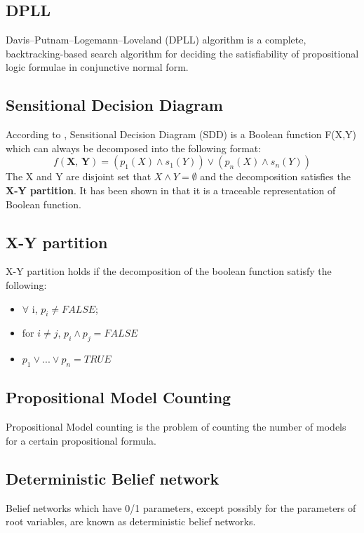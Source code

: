     \subsection{DPLL}
    Davis–Putnam–Logemann–Loveland (DPLL) algorithm is a complete, backtracking-based search algorithm for deciding the satisfiability of propositional logic formulae in conjunctive normal form. \cite{Davis:1960:CPQ:321033.321034}
    
   
    \subsection{Sensitional Decision Diagram}
    According to \cite{Darwiche:2011:SNC:2283516.2283536}, Sensitional Decision Diagram (SDD) is a Boolean function F(X,Y) which can always be decomposed into the following format:
    $$f(\textbf{X, Y}) = (p_{1}(X) \wedge s_{1}(Y)) \vee (p_{n}(X) \wedge s_{n}(Y)) $$
    The X and Y are disjoint set that $X \wedge Y = \emptyset$ and the decomposition satisfies the \textbf{X-Y partition}. It has been shown in \cite{Darwiche:2011:SNC:2283516.2283536} that it is a traceable representation of Boolean function.
    
    \subsection{X-Y partition}
    X-Y partition holds if the decomposition of the boolean function satisfy the following:
    \begin{itemize}
        \item  $\forall$ i, $p_{i} \neq FALSE$;
        \item for $i \neq j$, $p_{i} \wedge p_{j} = FALSE$
        \item $p_{1} \vee ... \vee p_{n} = TRUE$
    \end{itemize}
    
    \subsection{Propositional Model Counting}
    Propositional Model counting is the problem of counting the number of models for a certain propositional formula.\cite{Biere:2009:HSV:1550723-sat-handbook}
    
    \subsection{Deterministic Belief network}
    Belief networks which have 0/1 parameters, except possibly for the parameters of root variables, are known as deterministic belief networks.\cite{enc1}
    
    
    